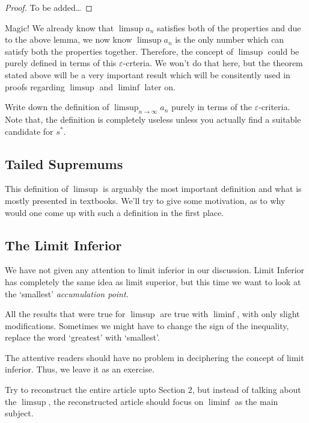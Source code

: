 \documentclass[parskip=half, numbers=endperiod, 11pt]{scrartcl}
\begin{document}
\begin{proof}
	To be added\dots
\end{proof}

Magic! We already know that $\limsup a_n$ satisfies both
of the properties and due to the above lemma, we now know
$\limsup a_n$ is the only number which can satisfy both the
properties together. Therefore, the concept of
$\limsup$ could be purely defined in terms of this
$\varepsilon$-crteria. We won't do that here, but the
theorem stated above will be a very important result which
will be consitently used in proofs regarding $\limsup$
and $\liminf$ later on.

\begin{exercise}[Optional]
	Write down the definition of
	$\limsup_{n \to \infty} a_n$ purely in terms of
	the $\varepsilon$-criteria. Note that, the definition
	is completely useless unless you actually find a
	suitable candidate for $s^\ast$.
\end{exercise}

\subsection{Tailed Supremums}
This definition of $\limsup$ is arguably the most
important definition and what is mostly presented in
textbooks. We'll try to give some motivation, as to why
would one come up with such a definition in the
first place.


\subsection{The Limit Inferior}

We have not given any attention to limit inferior
in our discussion. Limit Inferior has completely the same
idea as limit superior, but this time we want to look at
the `smallest' \emph{accumulation point}.

All the results that were true for $\limsup$ are
true with $\liminf$, with only slight modifications.
Sometimes we might have to change the sign of the
inequality, replace the word `greatest' with `smallest'.

The attentive readers should have no problem in
deciphering the concept of limit inferior. Thus, we
leave it as an exercise.

\begin{exercise}
	Try to reconstruct the entire article upto Section 2,
	but instead of talking about the $\limsup$, the
	reconstructed article should focus on $\liminf$ as
	the main subject.
\end{exercise}
\end{document}
